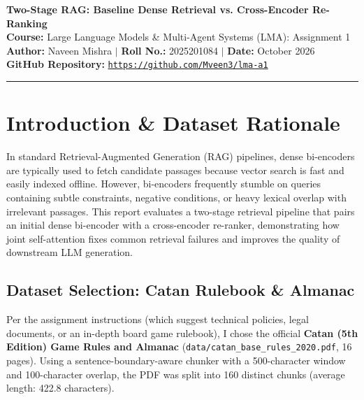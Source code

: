 \documentclass[11pt,a4paper]{article}
\begin{document}
\begin{center}
    {\LARGE \textbf{Two-Stage RAG: Baseline Dense Retrieval vs. Cross-Encoder Re-Ranking}}\\[0.4em]
    {\large \textbf{Course:} Large Language Models \& Multi-Agent Systems (LMA): Assignment 1}\\[0.3em]
    \textbf{Author:} Naveen Mishra \quad $\vert$ \quad \textbf{Roll No.:} 2025201084 \quad $\vert$ \quad \textbf{Date:} October 2026\\[0.3em]
    \textbf{GitHub Repository:} \href{https://github.com/Mveen3/lma-a1}{\texttt{https://github.com/Mveen3/lma-a1}}
\end{center}

\vspace{0.3em}
\hrule
\vspace{0.5em}

\section{Introduction \& Dataset Rationale}

In standard Retrieval-Augmented Generation (RAG) pipelines, dense bi-encoders are typically used to fetch candidate passages because vector search is fast and easily indexed offline. However, bi-encoders frequently stumble on queries containing subtle constraints, negative conditions, or heavy lexical overlap with irrelevant passages. This report evaluates a two-stage retrieval pipeline that pairs an initial dense bi-encoder with a cross-encoder re-ranker, demonstrating how joint self-attention fixes common retrieval failures and improves the quality of downstream LLM generation.

\subsection{Dataset Selection: Catan Rulebook \& Almanac}
Per the assignment instructions (which suggest technical policies, legal documents, or an in-depth board game rulebook), I chose the official \textbf{Catan (5th Edition) Game Rules and Almanac} (\texttt{data/catan\_base\_rules\_2020.pdf}, 16 pages). Using a sentence-boundary-aware chunker with a 500-character window and 100-character overlap, the PDF was split into 160 distinct chunks (average length: 422.8 characters). 
\end{document}
